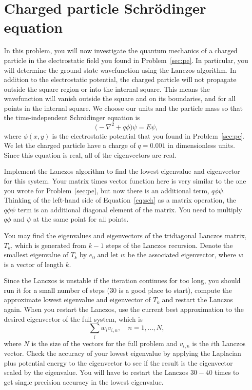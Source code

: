\section{Charged particle Schrödinger equation}

In this problem, you will now investigate the quantum mechanics of a charged particle in the
electrostatic field you found in Problem~\ref{sec:pe}. In particular, you will determine the
ground state wavefunction using the Lanczos algorithm. In addition to the electrostatic
potential, the charged particle will not propagate outside the square region or into the
internal square. This means the wavefunction will vanish outside the square and on its
boundaries, and for all points in the internal square. We choose our units and the particle
mass so that the time-independent Schrödinger equation is
%
\begin{equation}\label{eq:sch}
    \bigl( -\nabla^2 + q \phi \bigr) \psi = E \psi,
\end{equation}
%
where \(\phi(x, y)\) is the electrostatic potential that you found in Problem~\ref{sec:pe}.
We let the charged particle have a charge of \(q = 0.001\) in dimensionless units. Since
this equation is real, all of the eigenvectors are real.

Implement the Lanczos algorithm to find the lowest eigenvalue and eigenvector for this
system. Your matrix times vector function here is very similar to the one you wrote for
Problem~\ref{sec:pe}, but now there is an additional term, \(q \phi \psi\).
Thinking of the left-hand side of Equation~\eqref{eq:sch}
as a matrix operation, the \(q \phi \psi\) term is an additional diagonal element of the
matrix. You need to multiply \(q \phi\) and \(\psi\) at the same point for all points.

You may find the eigenvalues and eigenvectors of the tridiagonal Lanczos matrix, \(T_k\),
which is generated from \(k - 1\) steps of the Lanczos recursion. Denote the smallest
eigenvalue of \(T_k\) by \(e_0\) and let \(w\) be the associated eigenvector, where \(w\) is
a vector of length \(k\).

Since the Lanczos is unstable if the iteration continues for too long, you should run it for
a small number of steps (\(30\) is a good place to start), compute the approximate lowest
eigenvalue and eigenvector of \(T_k\) and restart the Lanczos again. When you restart the
Lanczos, use the current best approximation to the desired eigenvector of the full system,
which is
%
\begin{equation}
    \sum_i w_i v_{i, n}, \quad n = 1, \ldots, N,
\end{equation}
%
where \(N\) is the size of the vectors for the full problem and \(v_{i, n}\) is the \(i\)th
Lanczos vector. Check the accuracy of your lowest eigenvalue by applying the Laplacian plus
potential energy to the eigenvector to see if the result is the eigenvector scaled by the
eigenvalue. You will have to restart the Lanczos \(30 - 40\) times to get single precision
accuracy in the lowest eigenvalue.

